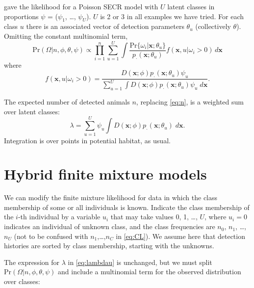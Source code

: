 \documentclass[
]{book}
\begin{document}
\citet[p.~381]{be08} gave the likelihood for a Poisson SECR model with \(U\) latent classes in proportions \(\psi\) = (\(\psi_1\), \ldots, \(\psi_U\)). \(U\) is 2 or 3 in all examples we have tried. For each class \(u\) there is an associated vector of detection parameters \(\theta_u\) (collectively \(\theta\)). Omitting the constant multinomial term,
\begin{equation}
\mbox{Pr}(\Omega | n, \phi,\theta, \psi) \propto \prod_{i=1}^n \sum_{u=1}^U\int\frac{\mbox{Pr}\{\omega_i | \mathbf{x}; \theta_u\}}{p_\cdot(\mathbf{x}; \theta_u)}
f(\mathbf{x}, u |\omega_i>0) \,d\mathbf{x}
\end{equation}
where
\begin{equation}
 f(\mathbf{x}, u | \omega_i > 0) = \frac{D(\mathbf{x}; \phi) p_\cdot(\mathbf{x}; \theta_u) \psi_u}{\sum_{u=1}^U \int D(\mathbf{x}; \phi) p_\cdot(\mathbf{x}; \theta_u) \psi_u \; d\mathbf{x}}.
\end{equation}

The expected number of detected animals \(n\), replacing \eqref{eq:n}, is a weighted sum over latent classes:
\begin{equation}
\lambda = \sum_{u=1}^U \psi_u \int D(\mathbf{x}; \phi) p_\cdot(\mathbf{x};\theta_u) \; d\mathbf{x}.
\label{eq:lambdau}
\end{equation}
Integration is over points in potential habitat, as usual.

\section{Hybrid finite mixture models}\label{hybrid-mixtures}


We can modify the finite mixture likelihood for data in which the class membership of some or all individuals is known. Indicate the class membership of the \(i\)-th individual by a variable \(u_i\) that may take values 0, 1, \ldots, \(U\), where \(u_i = 0\) indicates an individual of unknown class, and the class frequencies are \(n_0\), \(n_1\), \ldots, \(n_U\) (not to be confused with \(n_1\),\ldots,\(n_C\) in \eqref{eq:CL}). We assume here that detection histories are sorted by class membership, starting with the unknowns.

The expression for \(\lambda\) in \eqref{eq:lambdau} is unchanged, but we must split \(\mbox{Pr}(\Omega | n, \phi, \theta, \psi)\) and include a multinomial term for the observed distribution over classes:
\end{document}
